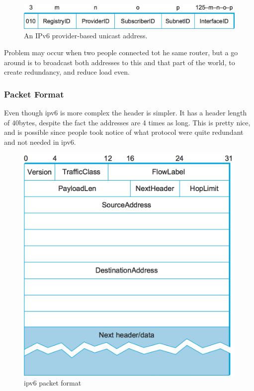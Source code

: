 \documentclass[11pt, a4paper]{article}
\begin{document}
\begin{figure}[H]
    \centering
    \includegraphics[width = \textwidth]{Pictures/ipv6 format when assigned.png}
    \caption{An IPv6 provider-based unicast address.}
    \label{fig:my_label}
\end{figure}
Problem may occur when two people connected tot he same router, but a go around is to broadcast both addresses to this and that part of the world, to create redundancy, and reduce load even.

\subsubsection{Packet Format}
Even though ipv6 is more complex the header is simpler. It has a header length of 40bytes, despite the fact the addresses are 4 times as long. This is pretty nice, and is possible since people took notice of what protocol were quite redundant and not needed in ipv6.

\begin{figure}[H]
    \centering
    \includegraphics[width = \textwidth]{Pictures/ipv6 packet fomrat.png}
    \caption{ipv6 packet format}
    \label{fig:my_label}
\end{figure}
\end{document}
